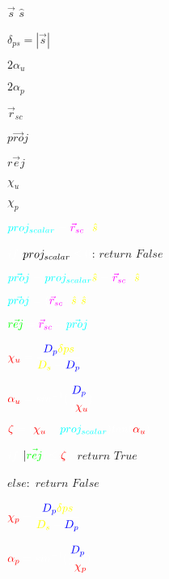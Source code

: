 \documentclass{article}
\begin{document}
\color{yellow}
\begin{center}\huge{

$\vec{s}$  $\hat{s}$

$\delta_{ps}=|\vec{s}|$ 

\color{red}
$2\alpha_u$

\color{red}
$2\alpha_p$

\color{magenta}
$\vec{r}_{sc}$

\color{cyan}
$p\vec{ro}j$

\color{green}
$r\vec{e}j$

\color{red}
$\chi_u$

\color{red}
$\chi_p$

$
\color{cyan}proj_{scalar}
\color{white}=
\color{magenta}\vec{r}_{sc}
\color{white}\cdot
\color{yellow}\hat{s}
$


$\color{white}if$
\color{cyan}$proj_{scalar}
\color{white}\leq 0$\color{white}:
$return$ $False$


$
\color{cyan}p\vec{ro}j
\color{white}=
\color{cyan}proj_{scalar}
\color{yellow}\hat{s}
\color{white}=
\color{magenta}\vec{r}_{sc}
\color{white}\cdot
\color{yellow}\hat{s}
$

$
\color{cyan}p\vec{ro}j
\color{white}=(
\color{magenta}\vec{r}_{sc}
\color{white}\cdot
\color{yellow}\hat{s}
\color{white})
\color{yellow}\hat{s}
$

$
\color{green}r\vec{e}j
\color{white}=
\color{magenta}\vec{r}_{sc}
\color{white}-
\color{cyan}p\vec{ro}j
$

$
\color{red}\chi_u
\color{white}=\cfrac{\color{blue}D_{p}\color{yellow}\delta{ps}\color{white}}{\color{yellow}D_s\color{white}-\color{blue}D_p}
$

$
\color{red}\alpha_u
\color{white}=sin^{-1}(
\cfrac{\color{blue}D_p\color{white}}{2\color{red}\chi_u})
$

$
\color{red}\zeta
\color{white}=(
\color{red}\chi_u
\color{white}-
\color{cyan}proj_{scalar}
\color{white})tan(
\color{red}\alpha_u\color{white})
$

$
\color{white}if$ $|
\color{green}\vec{rej}
\color{white}| \leq
\color{red}\zeta
\color{white}:$ $return$ $True$

$else:$ $return$ $False$


$
\color{red}\chi_p
\color{white}=\cfrac{\color{blue}D_{p}\color{yellow}\delta{ps}\color{white}}{\color{yellow}D_s\color{white}+\color{blue}D_p}
$

$
\color{red}\alpha_p
\color{white}=sin^{-1}(
\cfrac{\color{blue}D_p\color{white}}{2\color{red}\chi_p})
$

}
\end{center}
\end{document}
